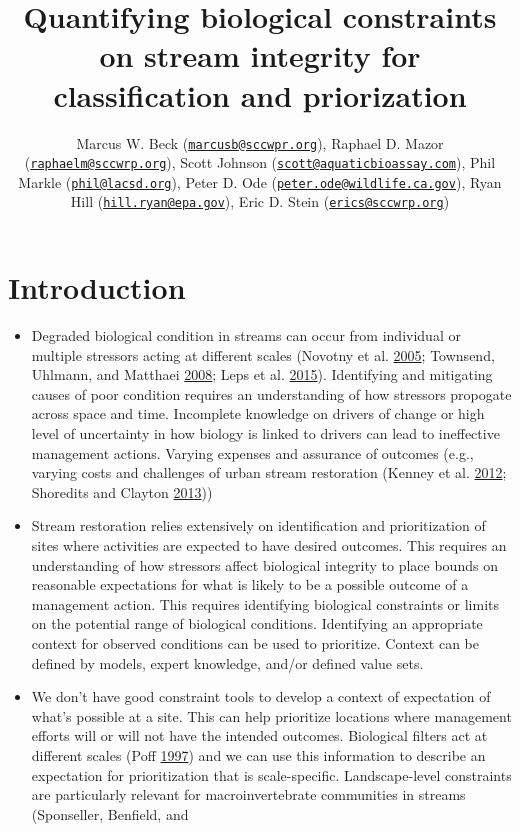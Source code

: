 \documentclass[]{article}
\title{Quantifying biological constraints on stream integrity for
classification and priorization}
\author{Marcus W. Beck
(\href{mailto:marcusb@sccwpr.org}{\nolinkurl{marcusb@sccwpr.org}}),
Raphael D. Mazor
(\href{mailto:raphaelm@sccwrp.org}{\nolinkurl{raphaelm@sccwrp.org}}),
Scott Johnson
(\href{mailto:scott@aquaticbioassay.com}{\nolinkurl{scott@aquaticbioassay.com}}),
Phil Markle (\href{mailto:phil@lacsd.org}{\nolinkurl{phil@lacsd.org}}),
Peter D. Ode
(\href{mailto:peter.ode@wildlife.ca.gov}{\nolinkurl{peter.ode@wildlife.ca.gov}}),
Ryan Hill
(\href{mailto:hill.ryan@epa.gov}{\nolinkurl{hill.ryan@epa.gov}}), Eric
D. Stein (\href{mailto:erics@sccwrp.org}{\nolinkurl{erics@sccwrp.org}})}
\date{}
\begin{document}
\maketitle

\section{Introduction}\label{introduction}

\begin{itemize}
\item
  Degraded biological condition in streams can occur from individual or
  multiple stressors acting at different scales (Novotny et al.
  \protect\hyperlink{ref-Novotny05}{2005}; Townsend, Uhlmann, and
  Matthaei \protect\hyperlink{ref-Townsend08}{2008}; Leps et al.
  \protect\hyperlink{ref-Leps15}{2015}). Identifying and mitigating
  causes of poor condition requires an understanding of how stressors
  propogate across space and time. Incomplete knowledge on drivers of
  change or high level of uncertainty in how biology is linked to
  drivers can lead to ineffective management actions. Varying expenses
  and assurance of outcomes (e.g., varying costs and challenges of urban
  stream restoration (Kenney et al.
  \protect\hyperlink{ref-Kenney12}{2012}; Shoredits and Clayton
  \protect\hyperlink{ref-Shoredits13}{2013}))
\item
  Stream restoration relies extensively on identification and
  prioritization of sites where activities are expected to have desired
  outcomes. This requires an understanding of how stressors affect
  biological integrity to place bounds on reasonable expectations for
  what is likely to be a possible outcome of a management action. This
  requires identifying biological constraints or limits on the potential
  range of biological conditions. Identifying an appropriate context for
  observed conditions can be used to prioritize. Context can be defined
  by models, expert knowledge, and/or defined value sets.
\item
  We don't have good constraint tools to develop a context of
  expectation of what's possible at a site. This can help prioritize
  locations where management efforts will or will not have the intended
  outcomes. Biological filters act at different scales (Poff
  \protect\hyperlink{ref-Poff97}{1997}) and we can use this information
  to describe an expectation for prioritization that is scale-specific.
  Landscape-level constraints are particularly relevant for
  macroinvertebrate communities in streams (Sponseller, Benfield, and

\end{itemize}
\end{document}
